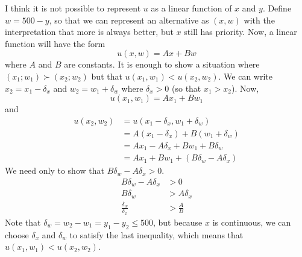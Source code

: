\begin{enumerate}
\begin{solution}
  \bs I think it is not possible to represent $u$ as a linear
  function of $x$ and $y$. Define $w=500-y$, so that we can represent
  an alternative as $(x,w)$ with the interpretation that more is always
  better, but $x$ still has priority. Now, a linear function will have
  the form
  \[
  u(x,w) = Ax + Bw
  \]
  where $A$ and $B$ are constants.
  It is enough to show a situation where $(x_1;w_1) \succ (x_2;w_2)$
  but that $u(x_1,w_1) < u(x_2,w_2)$. We can write $x_2=x_1-\delta_x$
  and $w_2=w_1+\delta_w$ where $\delta_x > 0$ (so that $x_1>x_2$).
  Now,
  \[
  u(x_1,w_1) = Ax_1 + Bw_1
  \]
  and
  \begin{align*}
    u(x_2,w_2) &= u(x_1-\delta_x,w_1+\delta_w) \\
    &= A(x_1-\delta_x) + B(w_1 + \delta_w) \\
    &= Ax_1 - A\delta_x + Bw_1 + B\delta_w \\
    &= Ax_1 + Bw_1 + (B\delta_w - A\delta_x)
  \end{align*}
  We need only to show that $B\delta_w-A\delta_x > 0$.
  \begin{align*}
    B\delta_w - A\delta_x &> 0 \\
    B\delta_w &> A\delta_x \\
    \frac{\delta_w}{\delta_x} &> \frac{A}{B}
  \end{align*}
  Note that $\delta_w = w_2-w_1 = y_1-y_2 \leq 500$, but because $x$
  is continuous, we can choose $\delta_x$ and $\delta_w$ to satisfy
  the last inequality, which means that $u(x_1,w_1) < u(x_2,w_2)$.
\end{solution}

\end{enumerate}
